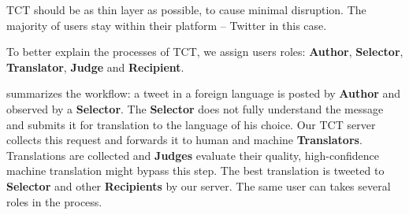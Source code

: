 \documentclass[11pt]{article}
\begin{document}
TCT should be as thin layer as possible, to cause 
minimal disruption. 
The majority of users stay within their platform -- Twitter in this
case.

To better explain the processes of TCT, we assign users roles: 
\textbf{Author}, \textbf{Selector}, \textbf{Translator}, \textbf{Judge} 
and \textbf{Recipient}.

 summarizes the workflow: a tweet in a foreign language is
posted by \textbf{Author} and observed by a \textbf{Selector}. 
The \textbf{Selector} does not fully understand the message 
and submits it for translation to the language of his choice. 
Our TCT server collects this request and
forwards it to human and machine \textbf{Translators}. Translations 
are collected and \textbf{Judges} evaluate their quality, high-confidence
machine translation might bypass this step. The best
translation is tweeted to \textbf{Selector} and other \textbf{Recipients} 
by our server. 
The same user can takes several roles in the process. 
\end{document}
